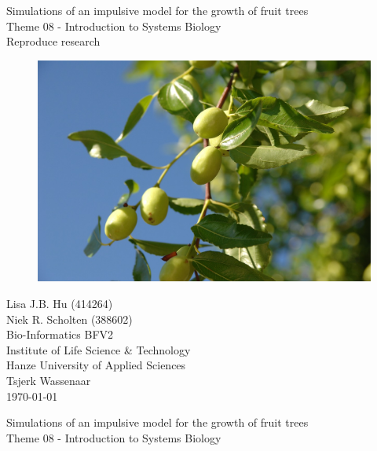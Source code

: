 \documentclass[
]{article}
\author{}
\date{\vspace{-2.5em}}
\begin{document}
\begin{center}

\Huge{Simulations of an impulsive model for the growth of fruit trees}\\
\vspace{\baselineskip}
\LARGE{Theme 08 - Introduction to Systems Biology}\\
\large{Reproduce research}\\
\vspace{\baselineskip}

\begin{figure}
  \centering\includegraphics[width=\linewidth]{jujube}
  \label{fig:jujube}
\end{figure}

\end{center}
\vspace{\baselineskip}

\normalsize
\vspace*{\fill}
\begin{flushright}
Lisa J.B. Hu (414264)\\
Niek R. Scholten (388602)\\
Bio-Informatics BFV2\\
Institute of Life Science \& Technology\\
Hanze University of Applied Sciences\\
Tsjerk Wassenaar\\
\today
\end{flushright}
\newpage

\null
\thispagestyle{empty}
\addtocounter{page}{-1}
\newpage

\begin{center}


\Huge{Simulations of an impulsive model for the growth of fruit trees}\\
\vspace{\baselineskip}
\LARGE{Theme 08 - Introduction to Systems Biology}\\
\vspace{\baselineskip}

\end{center}
\vspace{\baselineskip}
\end{document}
